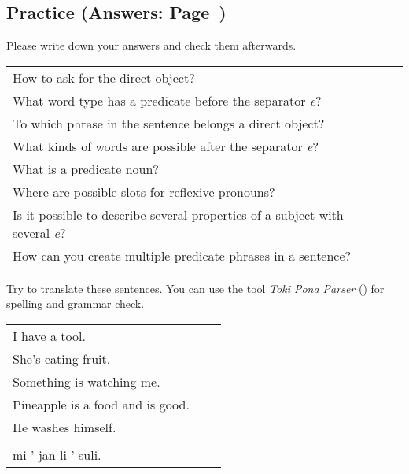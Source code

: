 \subsection*{Practice (Answers: Page~\pageref{'direct_objects_compund_sentences'})}
%
Please write down your answers and check them afterwards. 

\begin{supertabular}{p{5,5cm}|ll}
How to ask for the direct object? &&  \\ %
What word type has a predicate before the separator \textit{e}?  &&  \\ %
To which phrase in the sentence belongs a direct object? &&  \\ %
What kinds of words are possible after the separator \textit{e}?  &&  \\ %
What is a predicate noun?  &&  \\ %
Where are possible slots for reflexive pronouns? &&  \\ %
Is it possible to describe several properties of a subject with several \textit{e}? &&  \\ %
How can you create multiple predicate phrases in a sentence?  &&  \\ %
\end{supertabular} 

Try to translate these sentences. 
You can use the tool \textit{Toki Pona Parser} (\cite{www:rowa:02}) for spelling and grammar check. 

\begin{supertabular}{p{5,5cm}|ll}
I have a tool. &&  \\ %
She's eating fruit. &&  \\ %
Something is watching me. &&  \\ %
Pineapple is a food and is good. &&  \\ %
He washes himself. &&  \\ %
  && \\ %
mi ' jan li ' suli. &&  \\ %
\end{supertabular} 
